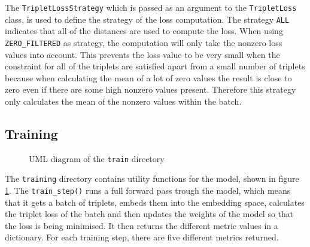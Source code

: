 \newline
\newline
The \texttt{TripletLossStrategy} which is passed as an argument to the \texttt{TripletLoss} class, is used to define the strategy of the loss computation. The strategy \texttt{ALL} indicates that all of the distances are used to compute the loss. When using \texttt{ZERO\_FILTERED} as strategy, the computation will only take the nonzero loss values into account. This prevents the loss value to be very small when the constraint for all of the triplets are satisfied apart from a small number of triplets because when calculating the mean of a lot of zero values the result is close to zero even if there are some high nonzero values present. Therefore this strategy only calculates the mean of the nonzero values within the batch.

\subsection{Training}
\label{sub:Component-Training}
\begin{figure}[htbp]
	\centering
	\caption{UML diagram of the \texttt{train} directory}
	\label{fig:UML-Train}
\end{figure}
\noindent
The \texttt{training} directory contains utility functions for the model, shown in figure \ref{fig:UML-Train}. The \texttt{train\_step()} runs a full forward pass trough the model, which means that it gets a batch of triplets, embeds them into the embedding space, calculates the triplet loss of the batch and then updates the weights of the model so that the loss is being minimised. It then returns the different metric values in a dictionary. For each training step, there are five different metrics returned. 

